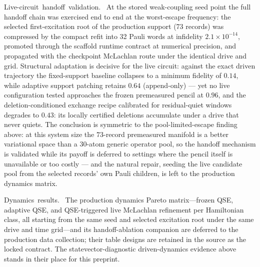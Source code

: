 \documentclass[
  reprint,
  amsmath,
  amssymb,
  aps,
  pra,
  nofootinbib,
  superscriptaddress,
  floatfix
]{revtex4-2}
\newcommand{\tentative}[1]{\textcolor{red!70!black}{#1}}
\newcommand{\structlabel}[1]{\noindent\mbox{\tentative{#1.}}~}
\begin{document}
\structlabel{Live-circuit handoff validation}
At the stored weak-coupling seed point the full handoff chain was exercised end to end at the worst-escape frequency: the selected first-excitation root of the production support (73 records) was compressed by the compact refit into 32 Pauli words at infidelity $2.1\times10^{-14}$, promoted through the scaffold runtime contract at numerical precision, and propagated with the checkpoint McLachlan route under the identical drive and grid.  Structural adaptation is decisive for the live circuit: against the exact driven trajectory the fixed-support baseline collapses to a minimum fidelity of $0.14$, while adaptive support patching retains $0.64$ (append-only) --- yet no live configuration tested approaches the frozen premeasured pencil at $0.96$, and the deletion-conditioned exchange recipe calibrated for residual-quiet windows degrades to $0.43$: its locally certified deletions accumulate under a drive that never quiets.  The conclusion is symmetric to the pool-limited-escape finding above: at this system size the $73$-record premeasured manifold is a better variational space than a $30$-atom generic operator pool, so the handoff mechanism is validated while its payoff is deferred to settings where the pencil itself is unavailable or too costly --- and the natural repair, seeding the live candidate pool from the selected records' own Pauli children, is left to the production dynamics matrix.

\structlabel{Dynamics results}
The production dynamics Pareto matrix---frozen QSE, adaptive QSE, and QSE-triggered live McLachlan refinement per Hamiltonian class, all starting from the same seed and selected excitation root under the same drive and time grid---and its handoff-ablation companion are deferred to the production data collection; their table designs are retained in the source as the locked contract.  The statevector-diagnostic driven-dynamics evidence above stands in their place for this preprint.
\end{document}
